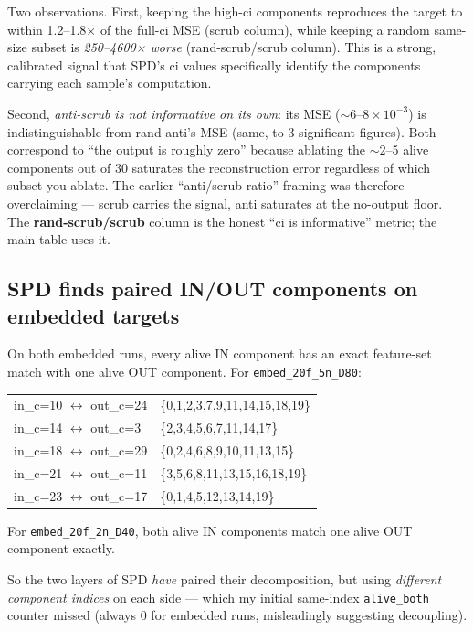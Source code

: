 \documentclass[11pt]{article}
\begin{document}
Two observations. First, keeping the high-ci components reproduces the
target to within 1.2--1.8× of the full-ci MSE (scrub column), while
keeping a random same-size subset is \emph{250--4600× worse}
(rand-scrub/scrub column). This is a strong, calibrated signal that
SPD's ci values specifically identify the components carrying each
sample's computation.

Second, \emph{anti-scrub is not informative on its own}: its MSE
($\sim 6$--$8\times 10^{-3}$) is indistinguishable from rand-anti's MSE
(same, to 3 significant figures). Both correspond to ``the output is
roughly zero'' because ablating the $\sim 2$--5 alive components out of
30 saturates the reconstruction error regardless of which subset you
ablate. The earlier ``anti/scrub ratio'' framing was therefore
overclaiming --- scrub carries the signal, anti saturates at the
no-output floor. The \textbf{rand-scrub/scrub} column is the honest
``ci is informative'' metric; the main table uses it.

\subsection{SPD finds paired IN/OUT components on embedded targets}

On both embedded runs, every alive IN component has an exact
feature-set match with one alive OUT component. For
\texttt{embed\_20f\_5n\_D80}:
\begin{center}\small\begin{tabular}{ll}
in\_c=10 $\leftrightarrow$ out\_c=24 & \{0,1,2,3,7,9,11,14,15,18,19\} \\
in\_c=14 $\leftrightarrow$ out\_c=3  & \{2,3,4,5,6,7,11,14,17\} \\
in\_c=18 $\leftrightarrow$ out\_c=29 & \{0,2,4,6,8,9,10,11,13,15\} \\
in\_c=21 $\leftrightarrow$ out\_c=11 & \{3,5,6,8,11,13,15,16,18,19\} \\
in\_c=23 $\leftrightarrow$ out\_c=17 & \{0,1,4,5,12,13,14,19\} \\
\end{tabular}\end{center}
For \texttt{embed\_20f\_2n\_D40}, both alive IN components match one
alive OUT component exactly.

So the two layers of SPD \emph{have} paired their decomposition, but
using \emph{different component indices} on each side — which my
initial same-index \texttt{alive\_both} counter missed (always $0$ for
embedded runs, misleadingly suggesting decoupling).
\end{document}
